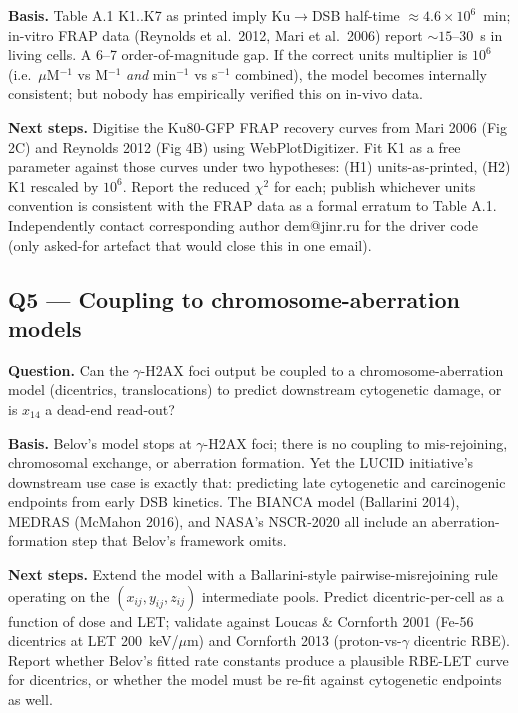 \textbf{Basis.} Table A.1 K1..K7 as printed imply Ku$\to$DSB half-time
$\approx 4.6\times 10^6$~min; in-vitro FRAP data (Reynolds et al.\ 2012,
Mari et al.\ 2006) report $\sim 15$--$30$~s in living cells. A 6--7 order-of-magnitude
gap. If the correct units multiplier is $10^6$ (i.e.\ $\mu$M$^{-1}$ vs M$^{-1}$
\emph{and} min$^{-1}$ vs s$^{-1}$ combined), the model becomes internally
consistent; but nobody has empirically verified this on in-vivo data.

\textbf{Next steps.} Digitise the Ku80-GFP FRAP recovery curves from Mari 2006
(Fig 2C) and Reynolds 2012 (Fig 4B) using WebPlotDigitizer. Fit K1 as a free
parameter against those curves under two hypotheses: (H1) units-as-printed,
(H2) K1 rescaled by $10^6$. Report the reduced $\chi^2$ for each; publish
whichever units convention is consistent with the FRAP data as a formal erratum
to Table A.1. Independently contact corresponding author dem@jinr.ru for the
driver code (only asked-for artefact that would close this in one email).

\subsection*{Q5 --- Coupling to chromosome-aberration models}

\textbf{Question.} Can the $\gamma$-H2AX foci output be coupled to a
chromosome-aberration model (dicentrics, translocations) to predict downstream
cytogenetic damage, or is $x_{14}$ a dead-end read-out?

\textbf{Basis.} Belov's model stops at $\gamma$-H2AX foci; there is no coupling
to mis-rejoining, chromosomal exchange, or aberration formation. Yet the LUCID
initiative's downstream use case is exactly that: predicting late cytogenetic
and carcinogenic endpoints from early DSB kinetics. The BIANCA model
(Ballarini 2014), MEDRAS (McMahon 2016), and NASA's NSCR-2020 all include an
aberration-formation step that Belov's framework omits.

\textbf{Next steps.} Extend the model with a Ballarini-style pairwise-misrejoining
rule operating on the $(x_{ij}, y_{ij}, z_{ij})$ intermediate pools. Predict
dicentric-per-cell as a function of dose and LET; validate against Loucas \&
Cornforth 2001 (Fe-56 dicentrics at LET 200~keV/$\mu$m) and Cornforth 2013
(proton-vs-$\gamma$ dicentric RBE). Report whether Belov's fitted rate constants
produce a plausible RBE-LET curve for dicentrics, or whether the model must be
re-fit against cytogenetic endpoints as well.

